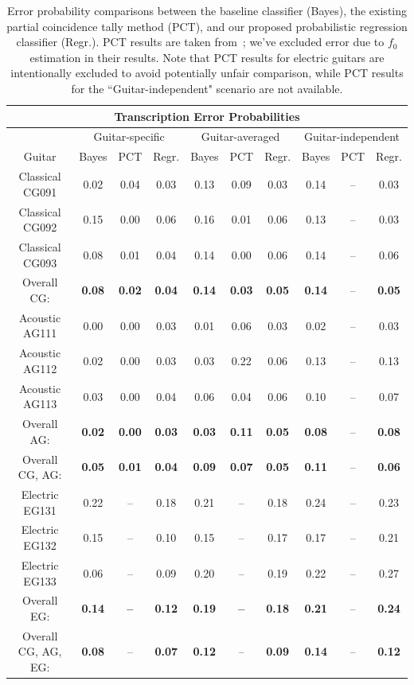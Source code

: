 \documentclass[12pt]{cmuthesis}
\begin{document}
\begin{table}[!htbp]
\begin{center}
\begin{tabular} {||c||c|c|c||c|c|c||c|c|c||}
\hline
\multicolumn{10}{||c||}{\bf{Transcription Error Probabilities}} \\
\hline
 & \multicolumn{3}{|c||}{Guitar-specific} & \multicolumn{3}{|c||}{Guitar-averaged}& \multicolumn{3}{|c||}{Guitar-independent}\\
\hline
Guitar & Bayes & PCT & Regr. & Bayes & PCT & Regr. & Bayes & PCT & Regr.\\
\hline
\hline
Classical CG091 & 0.02 & 0.04 & 0.03 & 0.13 & 0.09 & 0.03 & 0.14 & -- & 0.03 \\
\hline
Classical CG092 & 0.15 & 0.00 & 0.06 & 0.16 & 0.01 & 0.06 & 0.13 & -- & 0.03 \\
\hline
Classical CG093 & 0.08 & 0.01 & 0.04 & 0.14 & 0.00 & 0.06 & 0.14 & -- & 0.06 \\
\hline
Overall CG: & \bf{0.08} & \bf{0.02}  & \bf{0.04} & \bf{0.14} & \bf{0.03} & \bf{0.05} & \bf{0.14} & -- & \bf{0.05}\\
\hline
\hline
Acoustic AG111 & 0.00 & 0.00 & 0.03 & 0.01 & 0.06 & 0.03 & 0.02 & -- & 0.03 \\
\hline
Acoustic AG112 & 0.02 & 0.00 & 0.03 & 0.03 & 0.22 & 0.06 & 0.13 & -- & 0.13 \\
\hline
Acoustic AG113  & 0.03 & 0.00 & 0.04 & 0.06 & 0.04 & 0.06 & 0.10 & -- & 0.07\\
\hline
Overall AG: & \bf{0.02} & \bf{0.00} & \bf{0.03} & \bf{0.03} & \bf{0.11} & \bf{0.05} & \bf{0.08} & -- & \bf{0.08}\\
\hline
\hline
\hline
Overall CG, AG: & \bf{0.05} & \bf{0.01} & \bf{0.04} & \bf{0.09} & \bf{0.07} & \bf{0.05} & \bf{0.11} & -- & \bf{0.06}\\
\hline
\hline
\hline
Electric EG131 & 0.22 & -- & 0.18 & 0.21 & -- & 0.18 & 0.24 & -- & 0.23\\
\hline
Electric EG132 & 0.15 & -- & 0.10 & 0.15 & -- & 0.17 & 0.17 & -- & 0.21\\
\hline
Electric EG133 & 0.06 & -- & 0.09 & 0.20 & --  & 0.19 & 0.22 & -- & 0.27 \\
\hline
Overall EG: & \bf{0.14} & \bf{--} & \bf{0.12} & \bf{0.19} & \bf{--} & \bf{0.18} & \bf{0.21} & -- & \bf{0.24}\\
\hline
\hline
\hline
Overall CG, AG, EG: & \bf{0.08} & -- & \bf{0.07} & \bf{0.12} & -- & \bf{0.09} & \bf{0.14} & -- & \bf{0.12}\\
\hline
\end{tabular}
\caption{Error probability comparisons between the baseline classifier (Bayes), the existing partial coincidence tally method (PCT), and our proposed probabilistic regression classifier (Regr.). PCT results are taken from~\cite{barbanchoi2012}; we've excluded error due to $f_0$ estimation in their results. Note that PCT results for electric guitars are intentionally excluded to avoid potentially unfair comparison, while PCT results for the ``Guitar-independent" scenario are not available.}
\label{tab:error-results-RWC}
\end{center}
\end{table}
\end{document}
